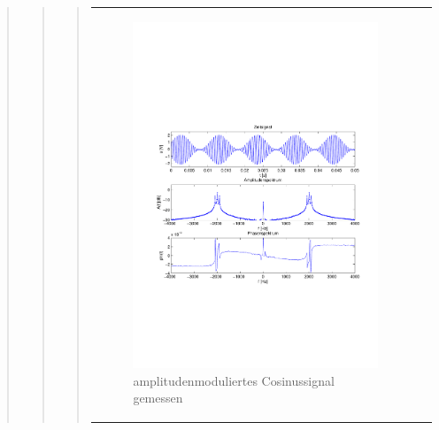 \begin{quote}
\begin{quote}
\begin{quote}
\begin{center}
\begin{tabular}{ll}
\begin{minipage}{0.6\textwidth}
                    \end{minipage}
                    \begin{minipage}{0.6\textwidth}
    
                         \begin{figure}[H]
                            \label{fig:}
                            \includegraphics[scale=0.4, trim = 2cm 6.5cm 1.5cm
                            8.5cm, clip]{./Bilder/Cosinusmodgemessen} %
                            \caption{amplitudenmoduliertes Cosinussignal gemessen}
                        \end{figure}
                   \vspace{-1.5em}
    
                    \end{minipage}
    

\end{tabular}
\end{center}
\end{quote}
\end{quote}
\end{quote}
